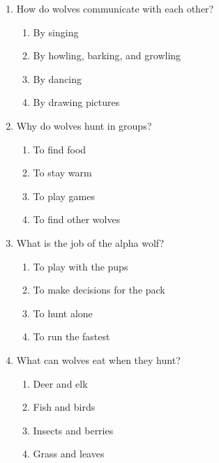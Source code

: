 \documentclass[12pt]{article}
\begin{document}
\begin{enumerate}
    \vspace{0.1cm}

    \item How do wolves communicate with each other?

    \begin{enumerate}[label=\Alph*.]
        \item By singing
        \item By howling, barking, and growling
        \item By dancing
        \item By drawing pictures
    \end{enumerate}

    \vspace{0.5cm}

    \item Why do wolves hunt in groups?

    \begin{enumerate}[label=\Alph*.]
        \item To find food
        \item To stay warm
        \item To play games
        \item To find other wolves
    \end{enumerate}

    \vspace{0.5cm}

    \item What is the job of the alpha wolf?

    \begin{enumerate}[label=\Alph*.]
        \item To play with the pups
        \item To make decisions for the pack
        \item To hunt alone
        \item To run the fastest
    \end{enumerate}

    \vspace{0.5cm}

    \item What can wolves eat when they hunt?

    \begin{enumerate}[label=\Alph*.]
        \item Deer and elk
        \item Fish and birds
        \item Insects and berries
        \item Grass and leaves
    \end{enumerate}


\end{enumerate}
\end{document}

